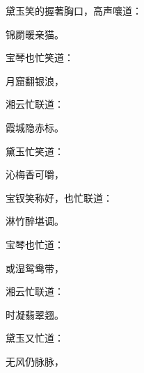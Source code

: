 \begin{parag}
    黛玉笑的握著胸口，高声嚷道：
\end{parag}
\begin{poem}
    \begin{pl} 锦罽暖亲猫。\end{pl}
\end{poem}
\begin{parag}
    宝琴也忙笑道：
\end{parag}
\begin{poem}
    \begin{pl} 月窟翻银浪，\end{pl}
\end{poem}
\begin{parag}
    湘云忙联道：
\end{parag}
\begin{poem}
    \begin{pl} 霞城隐赤标。\end{pl}
\end{poem}
\begin{parag}
    黛玉忙笑道：
\end{parag}
\begin{poem}
    \begin{pl} 沁梅香可嚼，\end{pl}
\end{poem}
\begin{parag}
    宝钗笑称好，也忙联道：
\end{parag}
\begin{poem}
    \begin{pl} 淋竹醉堪调。\end{pl}
\end{poem}
\begin{parag}
    宝琴也忙道：
\end{parag}
\begin{poem}
    \begin{pl} 或湿鸳鸯带，\end{pl}
\end{poem}
\begin{parag}
    湘云忙联道：
\end{parag}
\begin{poem}
    \begin{pl} 时凝翡翠翘。\end{pl}
\end{poem}
\begin{parag}
    黛玉又忙道：
\end{parag}
\begin{poem}
    \begin{pl} 无风仍脉脉，\end{pl}
\end{poem}
